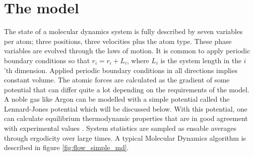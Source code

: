 \section{The model}
The state of a molecular dynamics system is fully described by seven variables per atom; three positions, three velocities plus the atom type. These phase variables are evolved through the laws of motion. It is common to apply periodic boundary conditions so that $r_i = r_i + L_i$, where $L_i$ is the system length in the $i$'th dimension. Applied periodic boundary conditions in all directions implies constant volume. The atomic forces are calculated as the gradient of some potential that can differ quite a lot depending on the requirements of the model. A noble gas like Argon can be modelled with a simple potential called the Lennard-Jones potential which will be discussed below. With this potential, one can calculate equilibrium thermodynamic properties that are in good agreement with experimental values \cite{verlet1967computer}. System statistics are sampled as ensable averages through ergodicity over large times. A typical Molecular Dynamics algorithm is described in figure \ref{fig:flow_simple_md}.
